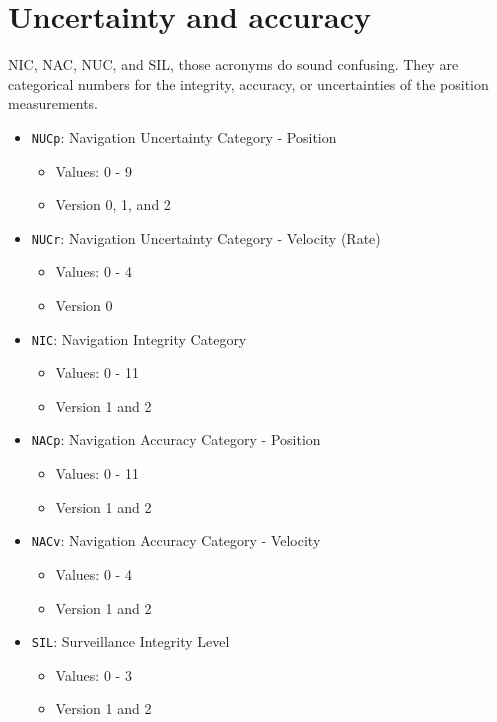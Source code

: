 \section{Uncertainty and accuracy}\label{uncertainty-and-accuracy}

NIC, NAC, NUC, and SIL, those acronyms do sound confusing. They are
categorical numbers for the integrity, accuracy, or uncertainties of the
position measurements.

\begin{itemize}

\item
  \texttt{NUCp}: Navigation Uncertainty Category - Position

  \begin{itemize}

  \item
    Values: 0 - 9
  \item
    Version 0, 1, and 2
  \end{itemize}
\item
  \texttt{NUCr}: Navigation Uncertainty Category - Velocity (Rate)

  \begin{itemize}

  \item
    Values: 0 - 4
  \item
    Version 0
  \end{itemize}
\item
  \texttt{NIC}: Navigation Integrity Category

  \begin{itemize}

  \item
    Values: 0 - 11
  \item
    Version 1 and 2
  \end{itemize}
\item
  \texttt{NACp}: Navigation Accuracy Category - Position

  \begin{itemize}

  \item
    Values: 0 - 11
  \item
    Version 1 and 2
  \end{itemize}
\item
  \texttt{NACv}: Navigation Accuracy Category - Velocity

  \begin{itemize}

  \item
    Values: 0 - 4
  \item
    Version 1 and 2
  \end{itemize}
\item
  \texttt{SIL}: Surveillance Integrity Level

  \begin{itemize}

  \item
    Values: 0 - 3
  \item
    Version 1 and 2
  \end{itemize}
\end{itemize}

